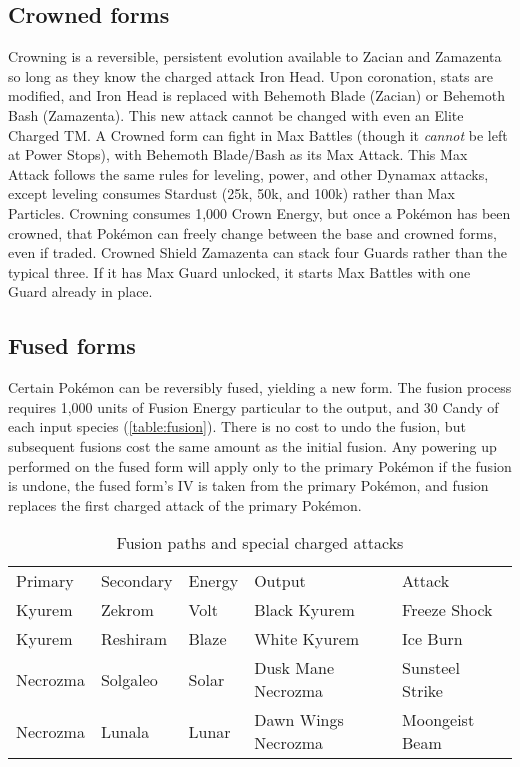 \subsection{Crowned forms\label{sec:crowned}}
Crowning is a reversible, persistent evolution available to Zacian and Zamazenta
 so long as they know the charged attack Iron Head.
Upon coronation, stats are modified, and Iron Head is replaced with Behemoth Blade (Zacian)
  or Behemoth Bash (Zamazenta).
This new attack cannot be changed with even an Elite Charged TM\@.
A Crowned form can fight in Max Battles (though it \textit{cannot} be left at Power Stops), with Behemoth Blade/Bash as its Max Attack.
This Max Attack follows the same rules for leveling, power, and other Dynamax attacks,
 except leveling consumes Stardust (25k, 50k, and 100k) rather than Max Particles.
Crowning consumes 1,000 Crown Energy, but once a Pokémon has been crowned,
  that Pokémon can freely change between the base and crowned
  forms, even if traded.
Crowned Shield Zamazenta can stack four Guards rather than the typical three.
If it has Max Guard unlocked, it starts Max Battles with one Guard already in place.

\subsection{Fused forms\label{sec:fusion}}
Certain Pokémon can be reversibly fused, yielding a new form.
The fusion process requires 1,000 units of Fusion Energy particular to the output,
 and 30 Candy of each input species (\autoref{table:fusion}).
There is no cost to undo the fusion, but subsequent fusions cost the same amount as the initial fusion.
Any powering up performed on the fused form will apply only to the primary
  Pokémon if the fusion is undone, the fused form's IV is taken from the primary Pokémon,
  and fusion replaces the first charged attack of the primary Pokémon.

\begin{table}[ht]
\centering
\footnotesize
\begin{tabular}{lllll}
Primary & Secondary & Energy & Output & Attack\\
\Midrule
Kyurem & Zekrom & Volt & Black Kyurem & Freeze Shock\\
Kyurem & Reshiram & Blaze & White Kyurem & Ice Burn\\
Necrozma & Solgaleo & Solar & Dusk Mane Necrozma & Sunsteel Strike\\
Necrozma & Lunala & Lunar & Dawn Wings Necrozma & Moongeist Beam\\
\end{tabular}
\caption{Fusion paths and special charged attacks\label{table:fusion}}
\end{table}

